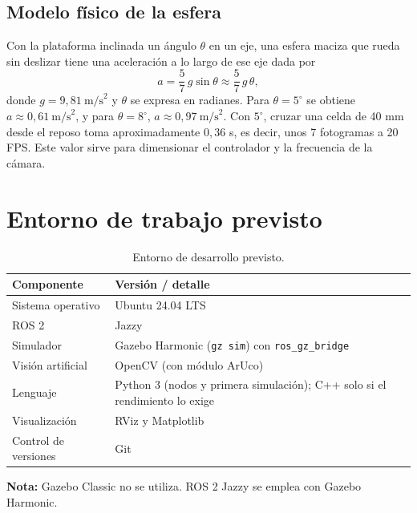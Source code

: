 \documentclass[11pt,a4paper]{article}
\begin{document}
\subsection{Modelo físico de la esfera}
Con la plataforma inclinada un ángulo $\theta$ en un eje, una esfera maciza que rueda sin deslizar tiene una aceleración a lo largo de ese eje dada por
\begin{equation}
    a = \frac{5}{7}\, g \sin\theta \approx \frac{5}{7}\, g\, \theta,
\end{equation}
donde $g = 9{,}81\ \text{m/s}^2$ y $\theta$ se expresa en radianes. Para $\theta = 5^\circ$ se obtiene $a \approx 0{,}61\ \text{m/s}^2$, y para $\theta = 8^\circ$, $a \approx 0{,}97\ \text{m/s}^2$. Con $5^\circ$, cruzar una celda de 40 mm desde el reposo toma aproximadamente $0{,}36$ s, es decir, unos 7 fotogramas a 20 FPS. Este valor sirve para dimensionar el controlador y la frecuencia de la cámara.

\section{Entorno de trabajo previsto}
\begin{table}[H]
    \centering
    \begin{tabular}{@{}ll@{}}
        \toprule
        \textbf{Componente} & \textbf{Versión / detalle} \\
        \midrule
        Sistema operativo & Ubuntu 24.04 LTS \\
        ROS 2 & Jazzy \\
        Simulador & Gazebo Harmonic (\texttt{gz sim}) con \texttt{ros\_gz\_bridge} \\
        Visión artificial & OpenCV (con módulo ArUco) \\
        Lenguaje & Python 3 (nodos y primera simulación); C++ solo si el rendimiento lo exige \\
        Visualización & RViz y Matplotlib \\
        Control de versiones & Git \\
        \bottomrule
    \end{tabular}
    \caption{Entorno de desarrollo previsto.}
\end{table}

\textbf{Nota:} Gazebo Classic no se utiliza. ROS 2 Jazzy se emplea con Gazebo Harmonic.

\end{document}
